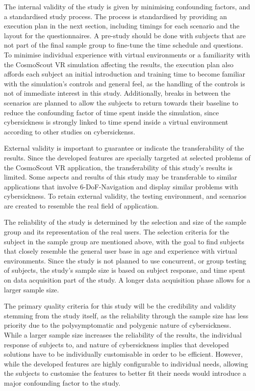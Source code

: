 The internal validity of the study is given by minimising confounding factors, and a standardised study process.
The process is standardised by providing an execution plan in the next section, including timings for each scenario
and the layout for the questionnaires.
A pre-study should be done with subjects that are not part of the final sample group to fine-tune the time schedule and
questions.
To minimise individual experience with virtual environments or a familiarity with the CosmoScout VR simulation
affecting the results, the execution plan also affords each subject an initial introduction and training time to
become familiar with the simulation's controls and general feel, as the handling of the controls is not of immediate
interest in this study.
Additionally, breaks in between the scenarios are planned to allow the subjects to return towards their baseline to
reduce the confounding factor of time spent inside the simulation, since cybersickness is strongly linked to time
spend inside a virtual environment according to other studies on cybersickenss.

External validity is important to guarantee or indicate the transferability of the results.
Since the developed features are specially targeted at selected problems of the CosmoScout VR application, the
transferability of this study's results is limited.
Some aspects and results of this study may be transferable to similar applications that involve 6-DoF-Navigation and
display similar problems with cybersickness.
To retain external validity, the testing environment, and scenarios are created to resemble the real field of
application.

The reliability of the study is determined by the selection and size of the sample group and its representation of
the real users.
The selection criteria for the subject in the sample group are mentioned above, with the goal to find subjects that
closely resemble the general user base in age and experience with virtual environments.
Since the study is not planned to use concurrent, or group testing of subjects, the study's sample size is based on
subject response, and time spent on data acquisition part of the study.
A longer data acquisition phase allows for a larger sample size.

The primary quality criteria for this study will be the credibility and validity stemming from the study itself, as
the reliability through the sample size has less priority due to the polysymptomatic and polygenic nature of
cybersickness.
While a larger sample size increases the reliability of the results, the individual response of subjects to, and
nature of cybersickness implies that developed solutions have to be individually customisable in order to be efficient.
However, while the developed features are highly configurable to individual needs, allowing the subjects to customise
the features to better fit their needs would introduce a major confounding factor to the study.


